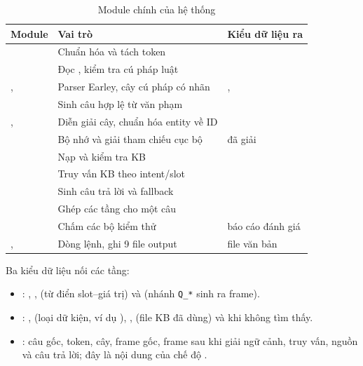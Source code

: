 \begin{table}[htbp]
  \centering
  \small
  \begin{tabularx}{\linewidth}{|P{3.2cm}|L|P{3.6cm}|}
    \hline
    \textbf{Module} & \textbf{Vai trò} & \textbf{Kiểu dữ liệu ra} \\ \hline
     & Chuẩn hóa và tách token &  \\ \hline
     & Đọc , kiểm tra cú pháp luật &  \\ \hline
    ,  & Parser Earley, cây cú pháp có nhãn & ,  \\ \hline
     & Sinh câu hợp lệ từ văn phạm &  \\ \hline
    ,  & Diễn giải cây, chuẩn hóa entity về ID &  \\ \hline
     & Bộ nhớ và giải tham chiếu cục bộ &  đã giải \\ \hline
     & Nạp và kiểm tra KB &  \\ \hline
     & Truy vấn KB theo intent/slot &  \\ \hline
     & Sinh câu trả lời và fallback &  \\ \hline
     & Ghép các tầng cho một câu &  \\ \hline
     & Chấm các bộ kiểm thử & báo cáo đánh giá \\ \hline
    ,  & Dòng lệnh, ghi 9 file output & file văn bản \\ \hline
  \end{tabularx}
  \caption{Module chính của hệ thống}
  \label{tab:modules}
\end{table}

Ba kiểu dữ liệu nối các tầng:
\begin{itemize}
  \item {}: , ,  (từ điển
        slot--giá trị) và  (nhánh \texttt{Q\_*} sinh ra frame).
  \item {}: ,  (loại dữ kiện, ví dụ
        ), ,  (file KB đã dùng) và
         khi không tìm thấy.
  \item {}: câu gốc, token, cây, frame gốc, frame sau khi giải
        ngữ cảnh, truy vấn, nguồn và câu trả lời; đây là nội dung của chế độ
        .
\end{itemize}

